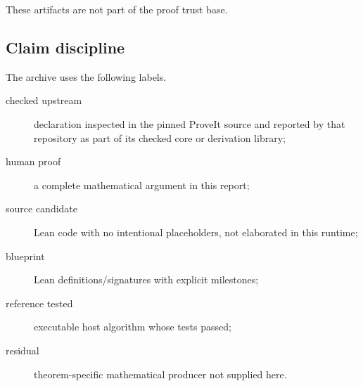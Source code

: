 These artifacts are not part of the proof trust base.

\subsection{Claim discipline}

The archive uses the following labels.

\begin{description}
\item[checked upstream] declaration inspected in the pinned ProveIt source and reported by that
repository as part of its checked core or derivation library;
\item[human proof] a complete mathematical argument in this report;
\item[source candidate] Lean code with no intentional placeholders, not elaborated in this runtime;
\item[blueprint] Lean definitions/signatures with explicit  milestones;
\item[reference tested] executable host algorithm whose tests passed;
\item[residual] theorem-specific mathematical producer not supplied here.
\end{description}
